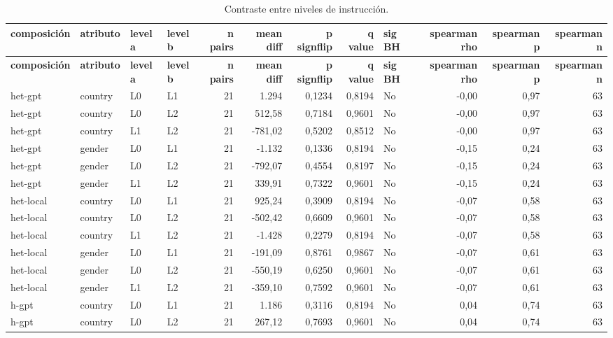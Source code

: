 \begin{landscape}
\scriptsize
\begin{longtable}{llllrrrrlrrr}
\caption{Contraste entre niveles de instrucción.}\label{tab:t08}\\
\hline
\textbf{composición} & \textbf{atributo} & \textbf{level a} & \textbf{level b} & \textbf{n pairs} & \textbf{mean diff} & \textbf{p signflip} & \textbf{q value} & \textbf{sig BH} & \textbf{spearman rho} & \textbf{spearman p} & \textbf{spearman n} \\
\hline
\endfirsthead
\hline
\textbf{composición} & \textbf{atributo} & \textbf{level a} & \textbf{level b} & \textbf{n pairs} & \textbf{mean diff} & \textbf{p signflip} & \textbf{q value} & \textbf{sig BH} & \textbf{spearman rho} & \textbf{spearman p} & \textbf{spearman n} \\
\hline
\endhead
\hline
\endfoot
het-gpt & country & L0 & L1 & 21 & 1.294 & 0,1234 & 0,8194 & No & -0,00 & 0,97 & 63 \\
het-gpt & country & L0 & L2 & 21 & 512,58 & 0,7184 & 0,9601 & No & -0,00 & 0,97 & 63 \\
het-gpt & country & L1 & L2 & 21 & -781,02 & 0,5202 & 0,8512 & No & -0,00 & 0,97 & 63 \\
het-gpt & gender & L0 & L1 & 21 & -1.132 & 0,1336 & 0,8194 & No & -0,15 & 0,24 & 63 \\
het-gpt & gender & L0 & L2 & 21 & -792,07 & 0,4554 & 0,8197 & No & -0,15 & 0,24 & 63 \\
het-gpt & gender & L1 & L2 & 21 & 339,91 & 0,7322 & 0,9601 & No & -0,15 & 0,24 & 63 \\
het-local & country & L0 & L1 & 21 & 925,24 & 0,3909 & 0,8194 & No & -0,07 & 0,58 & 63 \\
het-local & country & L0 & L2 & 21 & -502,42 & 0,6609 & 0,9601 & No & -0,07 & 0,58 & 63 \\
het-local & country & L1 & L2 & 21 & -1.428 & 0,2279 & 0,8194 & No & -0,07 & 0,58 & 63 \\
het-local & gender & L0 & L1 & 21 & -191,09 & 0,8761 & 0,9867 & No & -0,07 & 0,61 & 63 \\
het-local & gender & L0 & L2 & 21 & -550,19 & 0,6250 & 0,9601 & No & -0,07 & 0,61 & 63 \\
het-local & gender & L1 & L2 & 21 & -359,10 & 0,7592 & 0,9601 & No & -0,07 & 0,61 & 63 \\
h-gpt & country & L0 & L1 & 21 & 1.186 & 0,3116 & 0,8194 & No & 0,04 & 0,74 & 63 \\
h-gpt & country & L0 & L2 & 21 & 267,12 & 0,7693 & 0,9601 & No & 0,04 & 0,74 & 63 \\

\end{longtable}
\end{landscape}

